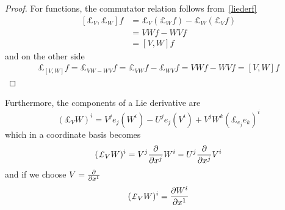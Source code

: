 \begin{proof}
        For functions, the commutator relation follows from~\eqref{liederf}
        \begin{equation*}
        \begin{aligned}
            [\pounds_V, \pounds_W] f & = \pounds_V (\pounds_W f) - \pounds_W (\pounds_V f) \\ & = V W f - W V f \\ & = [V, W] f
        \end{aligned}
        \end{equation*}
        and on the other side 
        \begin{equation*}
        \begin{aligned}
            \pounds_{[V,W]} f = \pounds_{V W - W V} f = \pounds_{VW} f - \pounds_{WV} f = VW f - WV f = [V, W] f 
        \end{aligned}
        \end{equation*}
    \end{proof}

    Furthermore, the components of a Lie derivative are 
    \begin{equation*}
        (\pounds_V W)^i = V^j e_j (W^i) - U^j e_j (V^i) + V^j W^k (\pounds_{e_j} e_k)^i
    \end{equation*}
    which in a coordinate basis becomes 
    \begin{equation*}
        (\pounds_V W)^i = V^j \pdv{}{x^j} W^i - U^j \pdv{}{x^j} V^i
    \end{equation*}
    and if we choose $V = \frac{\partial}{\partial x^1}$
    \begin{equation*}
        (\pounds_V W)^i = \pdv{W^i}{x^1}
    \end{equation*}

